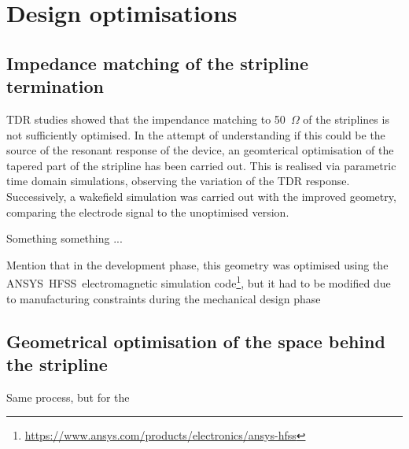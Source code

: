 \section[Design optimisations]{Design optimisations}

\subsection[Impedance matching of the stripline termination]{Impedance matching of the stripline termination}

TDR studies showed that the impendance matching to 50~$\Omega$ of the striplines is not sufficiently optimised. In the attempt of understanding if this could be the source of the resonant response of the device, an geomterical optimisation of the tapered part of the stripline has been carried out. This is realised via parametric time domain simulations, observing the variation of the TDR response. Successively, a wakefield simulation was carried out with the improved geometry, comparing the electrode signal to the unoptimised version.

Something something ...

Mention that in the development phase, this geometry was optimised using the ANSYS\textregistered~HFSS\texttrademark~electromagnetic simulation code\footnote{\url{https://www.ansys.com/products/electronics/ansys-hfss}}, but it had to be modified due to manufacturing constraints during the mechanical design phase\cite{Victor:private-comm}


\subsection[Geometrical optimisation of the space behind the stripline]{Geometrical optimisation of the space behind the stripline}

Same process, but for the
